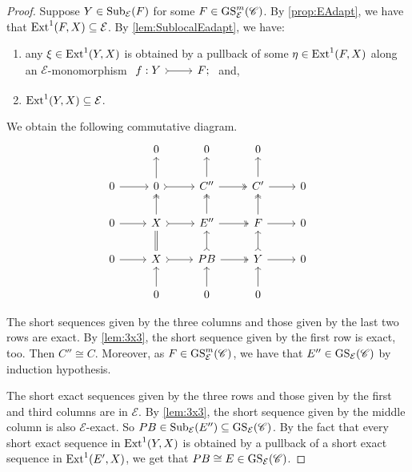 \begin{proof}
Suppose $Y \in \operatorname{Sub}_\mathcal{E}(F)$ for some $F \in \operatorname{GS}^{m}_{\mathcal{E}}(\mathscr{C})$. By \cref{prop:EAdapt}, we have that $\operatorname{Ext}^1(F,X) \subseteq \mathcal{E}$. By \cref{lem:SublocalEadapt}, we have:
\begin{enumerate}[label=$\bullet$, itemsep=1mm]
    \item any $\xi \in \operatorname{Ext}^1(Y,X)$ is obtained by a pullback of some $\eta \in \operatorname{Ext}^1(F,X)$ along an $\mathcal{E}$-monomorphism $\begin{tikzcd}
	 f: Y & F;
	\arrow[tail,from=1-1, to=1-2]
   \end{tikzcd}$ and,
    \item $\operatorname{Ext}^1(Y,X) \subseteq \mathcal{E}$.
\end{enumerate}
We obtain the following commutative diagram.
\[\begin{tikzcd}
         & 0 & 0 & 0 &  \\
	0 & 0 & C''  & C' &  0 \\
     0 & X & E'' & F & 0 \\
      0 & X & PB & Y & 0 \\
       & 0 & 0 & 0 & 
	\arrow[from=2-1, to=2-2]
	\arrow[tail, from=2-2, to=2-3]
	\arrow[two heads,from=2-3, to=2-4]
	\arrow[from=2-4, to=2-5]
        \arrow[from=3-1, to=3-2]
	\arrow[tail, from=3-2, to=3-3]
	\arrow[two heads,from=3-3, to=3-4]
	\arrow[from=3-4, to=3-5]
        \arrow[from=4-1, to=4-2]
	\arrow[tail, from=4-2, to=4-3]
	\arrow[two heads,from=4-3, to=4-4]
	\arrow[from=4-4, to=4-5]
        \arrow[from=5-2, to=4-2]
	\arrow[equals, from=4-2, to=3-2]
	\arrow[two heads,from=3-2, to=2-2]
	\arrow[from=2-2, to=1-2]
        \arrow[from=5-3, to=4-3]
	\arrow[tail, from=4-3, to=3-3]
	\arrow[two heads,from=3-3, to=2-3]
	\arrow[from=2-3, to=1-3]
        \arrow[from=5-4, to=4-4]
	\arrow[tail, from=4-4, to=3-4]
	\arrow[two heads,from=3-4, to=2-4]
	\arrow[from=2-4, to=1-4]
\end{tikzcd} \]

The short sequences given by the three columns and those given by the last two rows are exact. By \cref{lem:3x3}, the short sequence given by the first row is exact, too. Then $C'' \cong C$. Moreover, as $F \in \operatorname{GS}^{m}_{\mathcal{E}}(\mathscr{C})$, we have that $E'' \in \operatorname{GS}_{\mathcal{E}}(\mathscr{C})$ by induction hypothesis.

The short exact sequences given by the three rows and those given by the first and third columns are in ${\mathcal{E}}$. By \cref{lem:3x3}, the short sequence given by the middle column is also $\mathcal{E}$-exact. So $PB \in \operatorname{Sub}_\mathcal{E}(E'') \subseteq \operatorname{GS}_{\mathcal{E}}(\mathscr{C})$. By the fact that every short exact sequence in $\operatorname{Ext}^1(Y,X)$ is obtained by a pullback of a short exact sequence in $\operatorname{Ext}^1(E',X)$, we get that $PB \cong E \in \operatorname{GS}_{\mathcal{E}}(\mathscr{C})$.


\end{proof}
